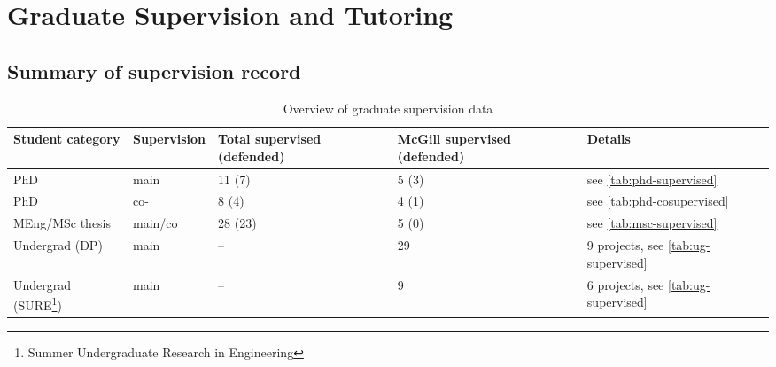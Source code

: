 \section{Graduate Supervision and Tutoring}

\subsection{Summary of supervision record}


\begin{table}[htb]
\footnotesize
\begin{tabular}{@{}p{3.5cm}lp{2.5cm}p{2.7cm}p{3.5cm}@{}}
\toprule
\textbf{Student category} & \textbf{Supervision} & \textbf{Total supervised (defended)} & \textbf{McGill supervised (defended)} & \textbf{Details} \\
\midrule
PhD & main & 11 (7) & 5 (3) & see \autoref{tab:phd-supervised}  \\
PhD & co- & 8 (4) & 4 (1) & see \autoref{tab:phd-cosupervised} \\
MEng/MSc thesis & main/co & 28 (23) & 5 (0) & see \autoref{tab:msc-supervised} \\
Undergrad (DP) & main & -- & 29 & 9 projects, see \autoref{tab:ug-supervised} \\ %
Undergrad (SURE\footnote{Summer Undergraduate Research in Engineering})  & main & -- & 9 & 6 projects, see \autoref{tab:ug-supervised} \\
\bottomrule
\end{tabular}
\caption{Overview of graduate supervision data}
\label{tab:graduate-supervisor-overview}
\end{table}


